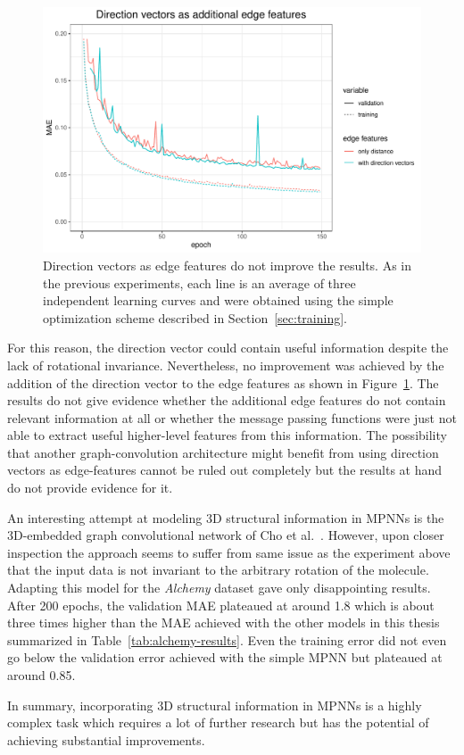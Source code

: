 \begin{figure}[H]
	\includegraphics[width=\linewidth]{figures/edge-direction-vectors}
	\caption{Direction vectors as edge features do not improve the results. As in the previous experiments, each line is an average of three independent learning curves and were obtained using the simple optimization scheme described in Section~\ref{sec:training}.}
	\label{fig:edge-direction-vectors}
\end{figure}

For this reason, the direction vector could contain useful information despite the lack of rotational invariance. Nevertheless, no improvement was achieved by the addition of the direction vector to the edge features as shown in Figure~\ref{fig:edge-direction-vectors}. The results do not give evidence whether the additional edge features do not contain relevant information at all or whether the message passing functions were just not able to extract useful higher-level features from this information. The possibility that another graph-convolution architecture might benefit from using direction vectors as edge-features cannot be ruled out completely but the results at hand do not provide evidence for it.

An interesting attempt at modeling 3D structural information in MPNNs is the 3D-embedded graph convolutional network of Cho et al.~\cite{Cho2018}. However, upon closer inspection the approach seems to suffer from same issue as the experiment above that the input data is not invariant to the arbitrary rotation of the molecule. Adapting this model for the \textit{Alchemy} dataset gave only disappointing results. After 200 epochs, the validation MAE plateaued at around 1.8 which is about three times higher than the MAE achieved with the other models in this thesis summarized in Table~\ref{tab:alchemy-results}. Even the training error did not even go below the validation error achieved with the simple MPNN but plateaued at around 0.85.

In summary, incorporating 3D structural information in MPNNs is a highly complex task which requires a lot of further research but has the potential of achieving substantial improvements.






